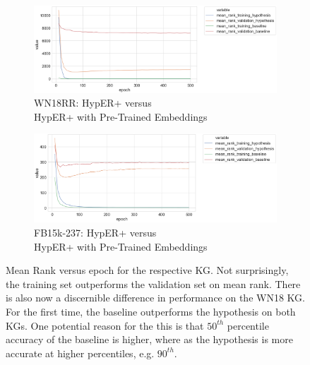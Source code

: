 \begin{figure}[H]
	\begin{subfigure}[b]{.5\linewidth}
   		\centering
    		\includegraphics[width=1.0\linewidth, height=0.6\linewidth]{WN18RR_mean_rank_Results_ptwv}
		\captionsetup{justification=centering}
		\caption{WN18RR: HypER+ versus \\ HypER+ with Pre-Trained Embeddings}
	\end{subfigure}
	\begin{subfigure}[b]{.5\linewidth}
   		\centering
		\includegraphics[width=1.0\linewidth, height=0.6\linewidth]{FB15k-237_mean_rank_Results_ptwv}
		\captionsetup{justification=centering}
		\caption{FB15k-237: HypER+ versus \\ HypER+ with Pre-Trained Embeddings}
	\end{subfigure}
	\captionsetup{justification=centering}
	\caption{Mean Rank versus epoch for the respective KG. Not surprisingly, the training set outperforms the validation set on mean rank. There is also now a discernible difference in performance on the WN18 KG. For the first time, the baseline outperforms the hypothesis on both KGs. One potential reason for the this is that $ 50^{th} $ percentile accuracy of the baseline is higher, where as the hypothesis is more accurate at higher percentiles, e.g. $ 90^{th} $.}
\end{figure}



